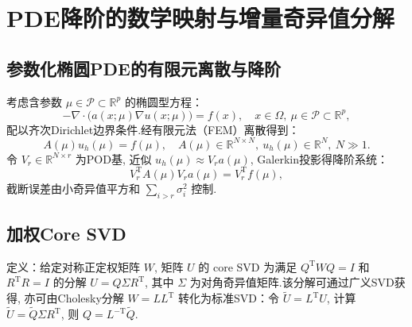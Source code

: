 
\section{PDE降阶的数学映射与增量奇异值分解}
\label{sec:intro}

\subsection{参数化椭圆PDE的有限元离散与降阶}
考虑含参数 $\mu\in\mathcal{P}\subset\mathbb{R}^p$ 的椭圆型方程：
\begin{equation}
-\nabla\cdot\bigl(a(x;\mu)\nabla u(x;\mu)\bigr)=f(x),\quad x\in\Omega,\ \mu\in\mathcal{P}\subset\mathbb{R}^p,
\label{eq:pde}
\end{equation}
配以齐次Dirichlet边界条件.经有限元法（FEM）离散得到：
\begin{equation}
A(\mu)u_h(\mu)=f(\mu),\quad A(\mu)\in\mathbb{R}^{N\times N},\ u_h(\mu)\in\mathbb{R}^N,\ N\gg1.
\end{equation}
令 $V_r\in\mathbb{R}^{N\times r}$ 为POD基, 近似 $u_h(\mu)\approx V_r a(\mu)$, Galerkin投影得降阶系统：
\begin{equation}
V_r^{\mathrm T}A(\mu)V_r a(\mu)=V_r^{\mathrm T}f(\mu),
\label{eq:rb}
\end{equation}
截断误差由小奇异值平方和 $\sum_{i>r}\sigma_i^2$ 控制.

\subsection{加权Core SVD}
定义\cite{fareed2018}：给定对称正定权矩阵 $W$, 矩阵 $U$ 的 core SVD 为满足 $Q^{\mathrm T}WQ=I$ 和 $R^{\mathrm T}R=I$ 的分解 $U=Q\Sigma R^{\mathrm T}$, 其中 $\Sigma$ 为对角奇异值矩阵.该分解可通过广义SVD获得, 亦可由Cholesky分解 $W=LL^{\mathrm T}$ 转化为标准SVD：令 $\tilde U=L^{\mathrm T}U$, 计算 $\tilde U= \tilde Q\Sigma R^{\mathrm T}$, 则 $Q=L^{-\mathrm T}\tilde Q$.


